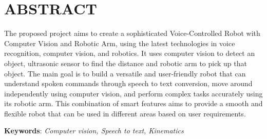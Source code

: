 \chapter*{ABSTRACT}
\begin{justify}

\noindent The proposed project aims to create a sophisticated Voice-Controlled Robot with Computer Vision and Robotic Arm, using the latest technologies in voice recognition, computer vision, and robotics. It uses computer vision to detect an object, ultrasonic sensor to find the distance and robotic arm to pick up that object. The main goal is to build a versatile and user-friendly robot that can understand spoken commands through speech to text conversion, move around independently using computer vision, and perform complex tasks accurately using its robotic arm. This combination of smart features aims to provide a smooth and flexible robot that can be used in different areas based on user requirements.
\vspace{1cm}

\noindent\textbf{Keywords}: \textit{Computer vision, Speech to text, Kinematics}

\end{justify}


